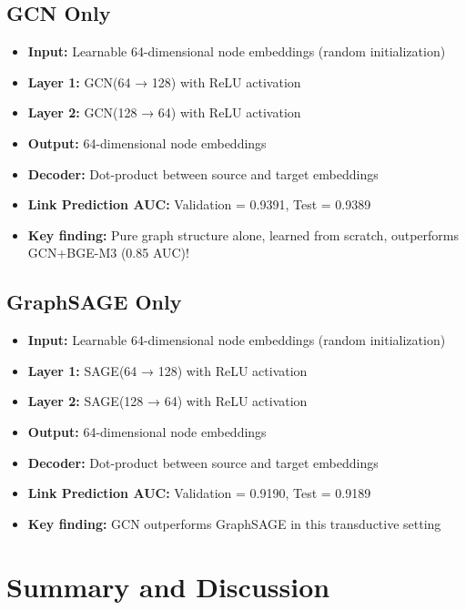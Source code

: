 \documentclass[12pt,a4paper]{article}
\begin{document}
\subsection{GCN Only}

\begin{itemize}
    \item \textbf{Input:} Learnable 64-dimensional node embeddings (random initialization)
    \item \textbf{Layer 1:} GCN(64 → 128) with ReLU activation
    \item \textbf{Layer 2:} GCN(128 → 64) with ReLU activation
    \item \textbf{Output:} 64-dimensional node embeddings
    \item \textbf{Decoder:} Dot-product between source and target embeddings
    \item \textbf{Link Prediction AUC:} Validation = 0.9391, Test = 0.9389
    \item \textbf{Key finding:} Pure graph structure alone, learned from scratch, outperforms GCN+BGE-M3 (0.85 AUC)!
\end{itemize}

\subsection{GraphSAGE Only}

\begin{itemize}
    \item \textbf{Input:} Learnable 64-dimensional node embeddings (random initialization)
    \item \textbf{Layer 1:} SAGE(64 → 128) with ReLU activation
    \item \textbf{Layer 2:} SAGE(128 → 64) with ReLU activation
    \item \textbf{Output:} 64-dimensional node embeddings
    \item \textbf{Decoder:} Dot-product between source and target embeddings
    \item \textbf{Link Prediction AUC:} Validation = 0.9190, Test = 0.9189
    \item \textbf{Key finding:} GCN outperforms GraphSAGE in this transductive setting
\end{itemize}

\section{Summary and Discussion}
\end{document}
